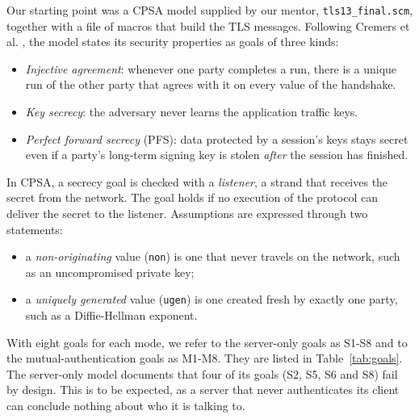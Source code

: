 \documentclass[11pt]{article}
\begin{document}
Our starting point was a CPSA model supplied by our mentor, \texttt{tls13\_final.scm}, together with a file of macros that build the TLS messages. Following Cremers et al. \cite{cremers2017tls13}, the model states its security properties as goals of three kinds:
\begin{itemize}
    \item \textit{Injective agreement}: whenever one party completes a run, there is a unique run of the other party that agrees with it on every value of the handshake.
    \item \textit{Key secrecy}: the adversary never learns the application traffic keys.
    \item \textit{Perfect forward secrecy} (PFS): data protected by a session's keys stays secret even if a party's long-term signing key is stolen \textit{after} the session has finished.
\end{itemize}

In CPSA, a secrecy goal is checked with a \textit{listener}, a strand that receives the secret from the network. The goal holds if no execution of the protocol can deliver the secret to the listener. Assumptions are expressed through two statements:
\begin{itemize}
    \item a \textit{non-originating} value (\texttt{non}) is one that never travels on the network, such as an uncompromised private key;
    \item a \textit{uniquely generated} value (\texttt{ugen}) is one created fresh by exactly one party, such as a Diffie-Hellman exponent.
\end{itemize}

With eight goals for each mode, we refer to the server-only goals as S1-S8 and to the mutual-authentication goals as M1-M8. They are listed in Table~\ref{tab:goals}. The server-only model documents that four of its goals (S2, S5, S6 and S8) fail by design. This is to be expected, as a server that never authenticates its client can conclude nothing about who it is talking to.
\end{document}

